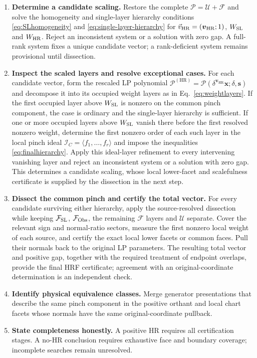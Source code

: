 \documentclass[a4paper,11pt]{article}
\newcommand{\s}{\boldsymbol{s}}
\newcommand{\HR}{\mathrm{HR}}
\newcommand{\FSL}{\mathcal F_{\rm SL}}
\newcommand{\FObs}{\mathcal F_{\rm Obs}}
\newcommand{\WSL}{W_{\rm SL}}
\newcommand{\WHR}{W_{\rm HR}}
\newcommand{\vHR}{\vec v_{\rm HR}}
\newcommand{\ideal}{\mathcal I}
\begin{document}
\begin{enumerate}[label=\textbf{\arabic*.},leftmargin=*]
\item \textbf{Determine a candidate scaling.}
      Restore the complete \(\mathcal P=\mathcal U+\mathcal F\) and solve the
      homogeneity and single-layer hierarchy conditions
      \eqref{eq:SLhomogeneity} and \eqref{eq:single-layer-hierarchy} for
      \(\vHR=(\boldsymbol v_{\HR};1)\), \(\WSL\) and \(\WHR\).  Reject an
      inconsistent system or a solution with zero gap.  A full-rank system
      fixes a unique candidate vector; a rank-deficient system remains
      provisional until dissection.
\item \textbf{Inspect the scaled layers and resolve exceptional cases.}
      For each candidate vector, form the rescaled LP polynomial
      \(\mathcal P^{(\HR)}=\mathcal P(\delta^{\boldsymbol v_{\HR}}
      \boldsymbol x;\delta,\s)\) and decompose it into its occupied weight
      layers as in Eq.~\eqref{eq:weightlayers}.  If the first occupied
      layer above \(\WSL\) is nonzero on the common pinch component, the case
      is ordinary and the single-layer hierarchy is sufficient.  If one or
      more occupied layers above \(\WSL\) vanish there before the first
      resolved nonzero weight, determine the first nonzero order of each such
      layer in the local pinch ideal
      \(\ideal_C=\langle f_1,\ldots,f_r\rangle\) and impose the inequalities
      \eqref{eq:finalhierarchy}.  Apply this ideal-layer refinement to every
      intervening vanishing layer and reject an inconsistent system or a
      solution with zero gap.  This determines a candidate scaling, whose
      local lower-facet and scalefulness certificate is supplied by the
      dissection in the next step.
\item \textbf{Dissect the common pinch and certify the total vector.}
      For every candidate surviving either hierarchy, apply the source-resolved
      dissection while keeping \(\FSL\), \(\FObs\), the remaining
      \(\mathcal F\) layers and \(\mathcal U\) separate.  Cover the relevant
      sign and normal-ratio sectors, measure the first nonzero local weight of
      each source, and certify the exact local lower facets or common faces.
      Pull their normals back to the original LP parameters.  The resulting
      total vector and positive gap, together with the required treatment of
      endpoint overlaps, provide the final HRF certificate; agreement with an
      original-coordinate determination is an independent check.
\item \textbf{Identify physical equivalence classes.}
      Merge generator presentations that describe the same pinch component
      in the positive orthant and local chart facets whose normals have the
      same original-coordinate pullback.
\item \textbf{State completeness honestly.}
      A positive HR requires all certification stages.  A no-HR conclusion
      requires exhaustive face and boundary coverage; incomplete searches
      remain unresolved.
\end{enumerate}
\end{document}
